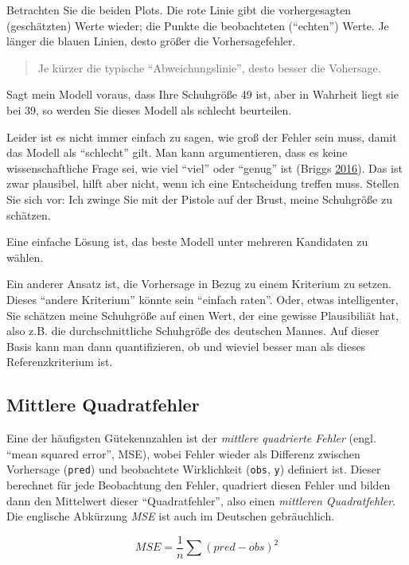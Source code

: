 \documentclass[12pt,]{book}
\begin{document}
Betrachten Sie die beiden Plots. Die rote Linie gibt die vorhergesagten
(geschätzten) Werte wieder; die Punkte die beobachteten (``echten'')
Werte. Je länger die blauen Linien, desto größer die Vorhersagefehler.

\begin{quote}
Je kürzer die typische ``Abweichungslinie'', desto besser die Vohersage.
\end{quote}

Sagt mein Modell voraus, dass Ihre Schuhgröße 49 ist, aber in Wahrheit
liegt sie bei 39, so werden Sie dieses Modell als schlecht beurteilen.

Leider ist es nicht immer einfach zu sagen, wie groß der Fehler sein
muss, damit das Modell als ``schlecht'' gilt. Man kann argumentieren,
dass es keine wissenschaftliche Frage sei, wie viel ``viel'' oder
``genug'' ist (Briggs \protect\hyperlink{ref-uncertainty}{2016}). Das
ist zwar plausibel, hilft aber nicht, wenn ich eine Entscheidung treffen
muss. Stellen Sie sich vor: Ich zwinge Sie mit der Pistole auf der
Brust, meine Schuhgröße zu schätzen.

Eine einfache Lösung ist, das beste Modell unter mehreren Kandidaten zu
wählen.

Ein anderer Ansatz ist, die Vorhersage in Bezug zu einem Kriterium zu
setzen. Dieses ``andere Kriterium'' könnte sein ``einfach raten''. Oder,
etwas intelligenter, Sie schätzen meine Schuhgröße auf einen Wert, der
eine gewisse Plausibiliät hat, also z.B. die durchschnittliche
Schuhgröße des deutschen Mannes. Auf dieser Basis kann man dann
quantifizieren, ob und wieviel besser man als dieses Referenzkriterium
ist.

\subsection{Mittlere Quadratfehler}\label{mittlere-quadratfehler}

Eine der häufigsten Gütekennzahlen ist der \emph{mittlere quadrierte
Fehler} (engl. ``mean squared error'', MSE), wobei Fehler wieder als
Differenz zwischen Vorhersage (\texttt{pred}) und beobachtete
Wirklichkeit (\texttt{obs}, \texttt{y}) definiert ist. Dieser berechnet
für jede Beobachtung den Fehler, quadriert diesen Fehler und bilden dann
den Mittelwert dieser ``Quadratfehler'', also einen \emph{mittleren
Quadratfehler}. Die englische Abkürzung \emph{MSE} ist auch im Deutschen
gebräuchlich.

\[ MSE = \frac{1}{n} \sum{(pred - obs)^2} \]
\end{document}
